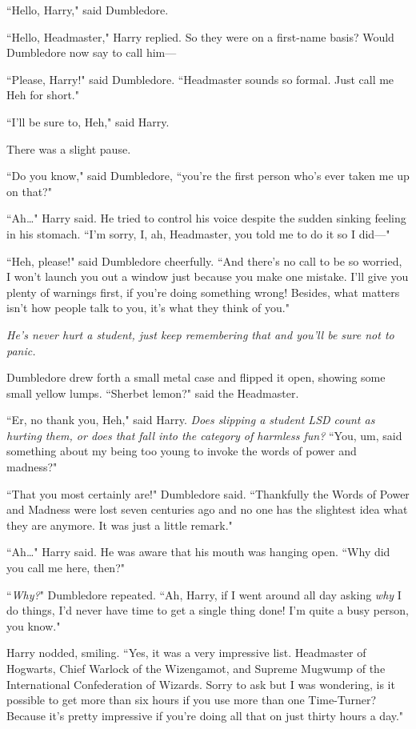 ``Hello, Harry," said Dumbledore.

``Hello, Headmaster," Harry replied. So they were on a first-name basis? Would Dumbledore now say to call him—

``Please, Harry!" said Dumbledore. ``Headmaster sounds so formal. Just call me Heh for short."

``I'll be sure to, Heh," said Harry.

There was a slight pause.

``Do you know," said Dumbledore, ``you're the first person who's ever taken me up on that?"

``Ah{\ldots}" Harry said. He tried to control his voice despite the sudden sinking feeling in his stomach. ``I'm sorry, I, ah, Headmaster, you told me to do it so I did—"

``Heh, please!" said Dumbledore cheerfully. ``And there's no call to be so worried, I won't launch you out a window just because you make one mistake. I'll give you plenty of warnings first, if you're doing something wrong! Besides, what matters isn't how people talk to you, it's what they think of you."

\emph{He's never hurt a student, just keep remembering that and you'll be sure not to panic.}

Dumbledore drew forth a small metal case and flipped it open, showing some small yellow lumps. ``Sherbet lemon?" said the Headmaster.

``Er, no thank you, Heh," said Harry. \emph{Does slipping a student LSD count as hurting them, or does that fall into the category of harmless fun?} ``You, um, said something about my being too young to invoke the words of power and madness?"

``That you most certainly are!" Dumbledore said. ``Thankfully the Words of Power and Madness were lost seven centuries ago and no one has the slightest idea what they are anymore. It was just a little remark."

``Ah{\ldots}" Harry said. He was aware that his mouth was hanging open. ``Why did you call me here, then?"

``\emph{Why?}" Dumbledore repeated. ``Ah, Harry, if I went around all day asking \emph{why} I do things, I'd never have time to get a single thing done! I'm quite a busy person, you know."

Harry nodded, smiling. ``Yes, it was a very impressive list. Headmaster of Hogwarts, Chief Warlock of the Wizengamot, and Supreme Mugwump of the International Confederation of Wizards. Sorry to ask but I was wondering, is it possible to get more than six hours if you use more than one Time-Turner? Because it's pretty impressive if you're doing all that on just thirty hours a day."

